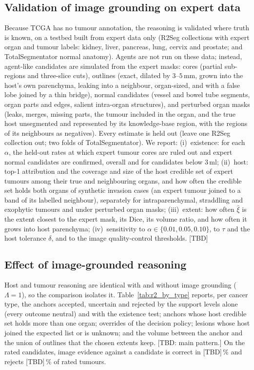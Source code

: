 \documentclass[fleqn,10pt]{olplainarticle}
\begin{document}
\subsection{Validation of image grounding on expert data}
\label{sec:results_expert}
Because TCGA has no tumour annotation, the reasoning is validated where truth is known, on a testbed built from expert
data only (R2Seg collections with expert organ and tumour labels: kidney, liver, pancreas, lung, cervix and prostate; and
TotalSegmentator normal anatomy). Agents are not run on these data; instead, agent-like candidates are simulated from the
expert masks: cores (partial sub-regions and three-slice cuts), outlines (exact, dilated by $3$--$5$\,mm, grown into the
host's own parenchyma, leaking into a neighbour, organ-sized, and with a false lobe joined by a thin bridge), normal
candidates (vessel and bowel tube segments, organ parts and edges, salient intra-organ structures), and perturbed organ
masks (leaks, merges, missing parts, the tumour included in the organ, and the true host unsegmented and represented by
its knowledge-base region, with the regions of its neighbours as negatives). Every estimate is held out (leave one R2Seg
collection out; two folds of TotalSegmentator). We report: (i)~existence: for each $\alpha$, the held-out rates at which expert tumour cores are ruled out and expert normal
candidates are confirmed, overall and for candidates below $3$\,ml;
(ii)~host: top-1 attribution and the coverage and size of the host credible set of expert tumours among their true and
neighbouring organs, and how often the credible set holds both organs of synthetic invasion cases (an expert tumour joined
to a band of its labelled neighbour), separately for intraparenchymal,
straddling and exophytic tumours and under perturbed organ masks; (iii)~extent: how often $\hat\xi$ is the extent closest to
the expert mask, its Dice, its volume ratio, and how often it grows into host parenchyma; (iv)~sensitivity to $\alpha\in\{0.01,0.05,0.10\}$, to $\tau$ and the host tolerance $\delta$, and to the image
quality-control thresholds. [TBD]

\subsection{Effect of image-grounded reasoning}
\label{sec:results_r2}
Host and tumour reasoning are identical with and without image grounding ($\Lambda=1$), so the comparison isolates it.
Table~\ref{tab:r2_by_type} reports, per cancer type, the anchors accepted, uncertain and rejected by the support levels alone (every
outcome neutral) and with the existence test; anchors whose host credible set holds more than one organ; overrides of the
decision policy;
lesions whose host joined the expected list or is unknown; and the volume between the anchor and the union of outlines that the chosen extents keep. [TBD: main pattern.] On the rated candidates, image evidence against a
candidate is correct in [TBD]\,\% and rejects [TBD]\,\% of rated tumours.
\end{document}
